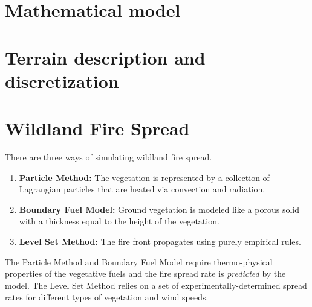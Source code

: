 \documentclass[journal,article,atmosphere,submit,moreauthors,pdftex]{Definitions/mdpi}
\begin{document}
\section{Mathematical model} \label{sec:matmodel}







\section{Terrain description and discretization} \label{sec:terraindisc}









\section{Wildland Fire Spread} \label{sec:firespread}

There are three ways of simulating wildland fire spread.

\begin{enumerate}
\item {\bf Particle Method:} The vegetation is represented by a collection of Lagrangian particles that are heated via convection and radiation.
\item {\bf Boundary Fuel Model:} Ground vegetation is modeled like a porous solid with a thickness equal to the height of the vegetation.
\item {\bf Level Set Method:} The fire front propagates using purely empirical rules.
\end{enumerate}
The Particle Method and Boundary Fuel Model require thermo-physical properties of the vegetative fuels and the fire spread rate is {\em predicted} by the model. The Level Set Method relies on a set of experimentally-determined spread rates for different types of vegetation and wind speeds.


\end{document}
